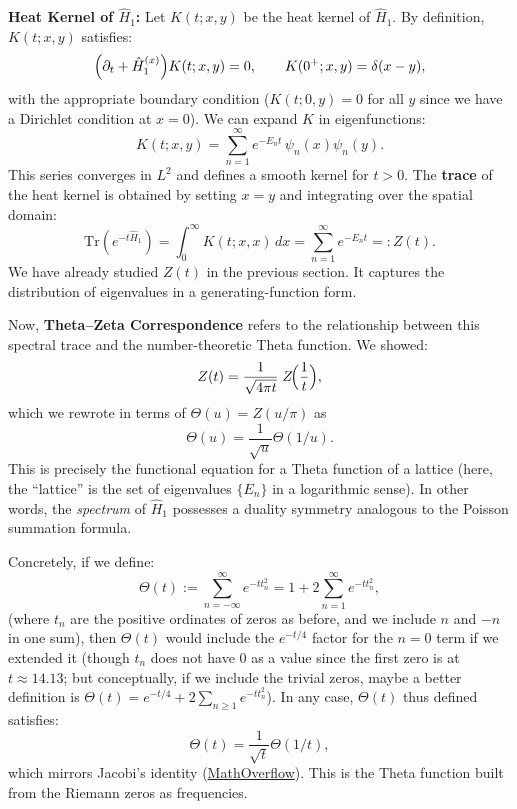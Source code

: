 \documentclass[12pt]{article}
\theoremstyle{plain}
\theoremstyle{definition}
\begin{document}
\textbf{Heat Kernel of \(\hat{H}_1\):} Let \(K(t;x,y)\) be the heat kernel of \(\hat{H}_1\). By definition, \(K(t;x,y)\) satisfies:
\[
\Bigl(\partial_t + \hat{H}_1^{(x)}\Bigr) K(t;x,y) = 0,\qquad K(0^+;x,y) = \delta(x-y),
\]
with the appropriate boundary condition (\(K(t;0,y)=0\) for all \(y\) since we have a Dirichlet condition at \(x=0\)). We can expand \(K\) in eigenfunctions:
\[
K(t;x,y) = \sum_{n=1}^\infty e^{-E_n t}\, \psi_n(x)\psi_n(y).
\]
This series converges in \(L^2\) and defines a smooth kernel for \(t>0\). The \textbf{trace} of the heat kernel is obtained by setting \(x=y\) and integrating over the spatial domain:
\[
\mathrm{Tr}(e^{-t\hat{H}_1}) = \int_0^\infty K(t;x,x)\,dx = \sum_{n=1}^\infty e^{-E_n t} =: Z(t).
\]
We have already studied \(Z(t)\) in the previous section. It captures the distribution of eigenvalues in a generating-function form.

Now, \textbf{Theta--Zeta Correspondence} refers to the relationship between this spectral trace and the number-theoretic Theta function. We showed:
\[
Z(t) = \frac{1}{\sqrt{4\pi t}}\; Z\!\Bigl(\frac{1}{t}\Bigr),
\]
which we rewrote in terms of \(\Theta(u) = Z(u/\pi)\) as 
\[
\Theta(u) = \frac{1}{\sqrt{u}}\Theta(1/u).
\]
This is precisely the functional equation for a Theta function of a lattice (here, the ``lattice'' is the set of eigenvalues \(\{E_n\}\) in a logarithmic sense). In other words, the \emph{spectrum} of \(\hat{H}_1\) possesses a duality symmetry analogous to the Poisson summation formula.

Concretely, if we define:
\[
\Theta(t) := \sum_{n=-\infty}^\infty e^{-t t_n^2} = 1 + 2\sum_{n=1}^\infty e^{-t t_n^2},
\]
(where \(t_n\) are the positive ordinates of zeros as before, and we include \(n\) and \(-n\) in one sum), then \(\Theta(t)\) would include the \(e^{-t/4}\) factor for the \(n=0\) term if we extended it (though \(t_n\) does not have 0 as a value since the first zero is at \(t\approx14.13\); but conceptually, if we include the trivial zeros, maybe a better definition is \(\Theta(t) = e^{-t/4} + 2\sum_{n\ge1} e^{-t t_n^2}\)). In any case, \(\Theta(t)\) thus defined satisfies:
\[
\Theta(t) = \frac{1}{\sqrt{t}}\Theta(1/t),
\]
which mirrors Jacobi's identity (\href{https://mathoverflow.net/questions/120067/what-do-theta-functions-have-to-do-with-quadratic-reciprocity#:~:text=arithmetic%20significance}{MathOverflow}). This is the Theta function built from the Riemann zeros as frequencies.
\end{document}
